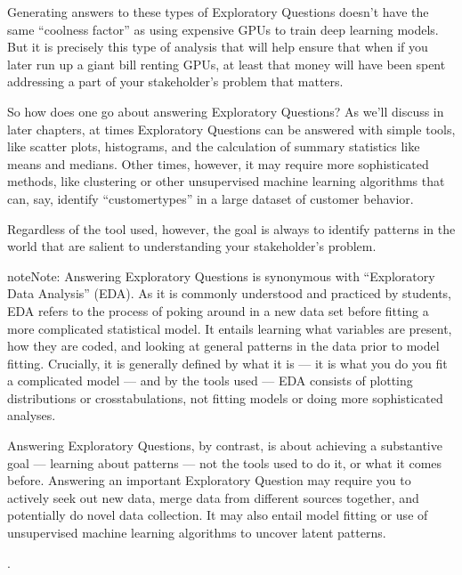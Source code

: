 \documentclass[letterpaper,10pt,english]{jupyterBook}
\begin{document}
\sphinxAtStartPar
Generating answers to these types of Exploratory Questions doesn’t have the same “coolness factor” as using expensive GPUs to train deep learning models. But it is precisely this type of analysis that will help ensure that when if you  later run up a giant bill renting GPUs, at least that money will have been spent addressing a part of your stakeholder’s problem that matters.

\sphinxAtStartPar
So how does one go about answering Exploratory Questions? As we’ll discuss in later chapters, at times Exploratory Questions can be answered with simple tools, like scatter plots, histograms, and the calculation of summary statistics like means and medians. Other times, however, it may require more sophisticated methods, like clustering or other unsupervised machine learning algorithms that can, say, identify “customer\sphinxhyphen{}types” in a large dataset of customer behavior.

\sphinxAtStartPar
Regardless of the tool used, however, the goal is always to identify patterns in the world that are salient to understanding your stakeholder’s problem.

\begin{sphinxadmonition}{note}{Note:}
\sphinxAtStartPar
Answering Exploratory Questions is  synonymous with “Exploratory Data Analysis” (EDA). As it is commonly understood and practiced by students, EDA refers to the process of poking around in a new data set before fitting a more complicated statistical model. It entails learning what variables are present, how they are coded, and  looking at general patterns in the data prior to model fitting. Crucially, it is generally defined by what it is  — it is what you do  you fit a complicated model — and by the tools used — EDA consists of plotting distributions or cross\sphinxhyphen{}tabulations, not fitting models or doing more sophisticated analyses.

\sphinxAtStartPar
Answering Exploratory Questions, by contrast, is about achieving a substantive goal — learning about patterns  — not the tools used to do it, or what it comes before. Answering an important Exploratory Question may require you to actively seek out new data, merge data from different sources together, and potentially do novel data collection. It may also entail model fitting or use of unsupervised machine learning algorithms to uncover latent patterns.

\sphinxAtStartPar
{\hyperref[\detokenize{30_questions/07_eda::doc}]{}}.
\end{sphinxadmonition}
\end{document}
